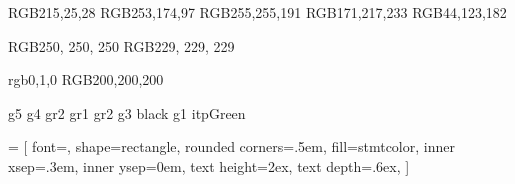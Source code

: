 
\usepackage[utf8]{inputenc}
\usepackage{xspace}
\usepackage{tabularx}
\usepackage[%
hyperindex,%
plainpages=false,%
pdfusetitle]{hyperref}
\usepackage[all]{hypcap}
\usepackage{algorithm}
\usepackage[noend]{algpseudocode}
\usepackage{cite}
\usepackage{booktabs}
\usepackage{url}
\usepackage{listings}
\usepackage{enumitem}
\usepackage{amsthm}
\usepackage{amsmath}
\usepackage{tikz}
\usetikzlibrary{positioning,shapes.geometric, arrows.meta ,automata, decorations.pathreplacing, calc, fit, backgrounds}
\usepackage{pgf}
\usepackage{slantsc}
\usepackage{geometry}
\usepackage{amssymb}
\usepackage{subcaption}
\usepackage{float}
\usepackage{pgf}
\usepackage{slashbox}
\usepackage{pgfgantt}
\usepackage{wrapfig}
\usepackage{pdflscape}
\usepackage{xcolor}
\usepackage{xparse}
\usepackage[%
colorinlistoftodos,%
color=cyan!50!white,%
bordercolor=cyan!50!black]{todonotes}

\usepackage{varwidth}
\usepackage[most]{tcolorbox}%
\usepackage{comment}
\usepackage{makecell}
\usepackage{stmaryrd}
\usepackage{nicematrix}
\usepackage{wrapfig}
\usepackage[nounderscore]{syntax}



\definecolor{g1}		{RGB}{215,25,28} %
\definecolor{g2}		{RGB}{253,174,97} %
\definecolor{g3}		{RGB}{255,255,191} %
\definecolor{g4}		{RGB}{171,217,233} %
\definecolor{g5}		{RGB}{44,123,182} %

\definecolor{gr1}		{RGB}{250, 250, 250}
\definecolor{gr2}		{RGB}{229, 229, 229} %

\definecolor{itpGreen}  {rgb}{0,1,0}
\definecolor{grey}      {RGB}{200,200,200}


		{g5}
			{g4}
			{gr2}
		{gr1}
		{gr2} %
	{g3} %
     {black} %
      {g1} %
              {itpGreen}



 = [%
font=\ttfamily,%
shape=rectangle,%
rounded corners=.5em,%
fill=stmtcolor,%
inner xsep=.3em,%
inner ysep=0em, %
text height=2ex, %
text depth=.6ex,
]



